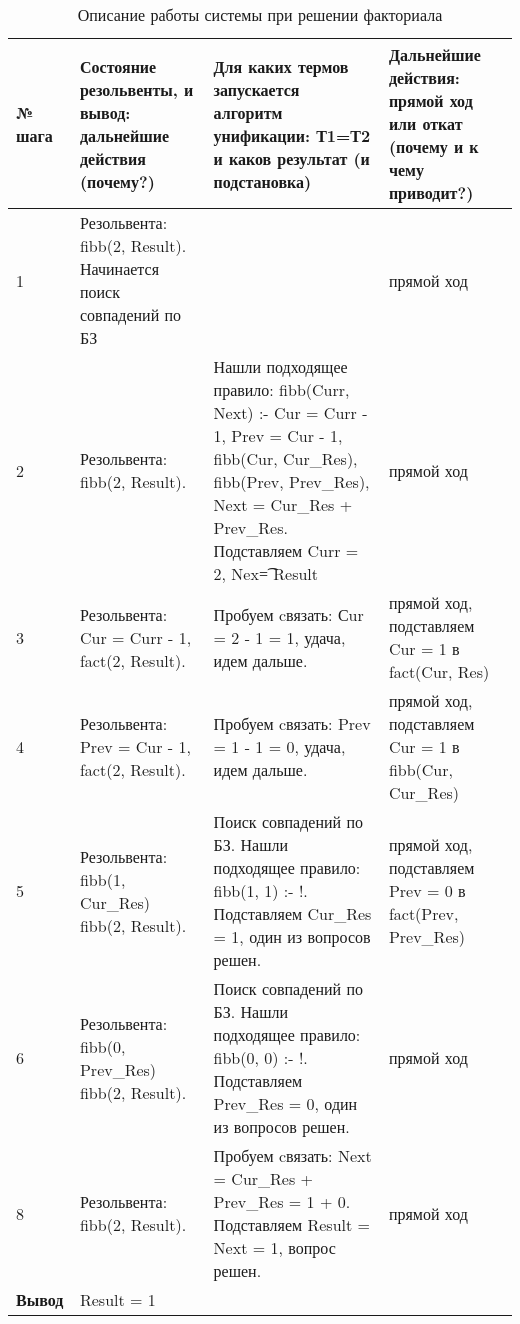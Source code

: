 \begin{table}
	\caption{Описание работы системы при решении факториала}
	\begin{tabular}{|p{1.2cm}|p{5cm}|p{5cm}|p{5cm}|}
		\hline
		№ шага & Состояние резольвенты, и вывод: дальнейшие действия (почему?) & Для каких термов запускается алгоритм унификации: Т1=Т2 и каков результат (и подстановка) & Дальнейшие действия: прямой ход или откат (почему и к чему приводит?) \\
		\hline
		1 & Резольвента: \newline fibb(2, Result). Начинается поиск совпадений по БЗ &  & прямой ход \\
		\hline
		2 & Резольвента: \newline fibb(2, Result). & Нашли подходящее правило: fibb(Curr, Next) :-  Cur = Curr - 1, Prev = Cur - 1, fibb(Cur, Cur\_Res), fibb(Prev, Prev\_Res), Next = Cur\_Res + Prev\_Res. Подставляем Curr = 2, Nex\t = Result & прямой ход \\
		\hline
		3 & Резольвента: \newline Cur = Curr - 1, \newline fact(2, Result). & Пробуем cвязать: Сur = 2 - 1 = 1, удача, идем дальше.   & прямой ход, подставляем Cur = 1 в fact(Cur, Res)\\
		\hline
		4 & Резольвента: \newline Prev = Cur - 1, \newline fact(2, Result). & Пробуем cвязать: Prev = 1 - 1 = 0, удача, идем дальше.   & прямой ход, подставляем Cur = 1 в fibb(Cur, Cur\_Res)\\
		\hline
		5 & Резольвента: \newline fibb(1, Cur\_Res) \newline fibb(2, Result). & Поиск совпадений по БЗ. Нашли подходящее правило: fibb(1, 1) :- !. Подставляем Cur\_Res = 1, один из вопросов решен.  & прямой ход, подставляем Prev = 0 в fact(Prev, Prev\_Res) \\
		\hline
		6 & Резольвента: \newline fibb(0, Prev\_Res) \newline fibb(2, Result). & Поиск совпадений по БЗ. Нашли подходящее правило: fibb(0, 0) :- !. Подставляем Prev\_Res = 0, один из вопросов решен.  & прямой ход\\
		\hline
		8 & Резольвента: \newline fibb(2, Result). & Пробуем cвязать: Next = Cur\_Res + Prev\_Res = 1 + 0. Подставляем Result = Next = 1, вопрос решен.  & прямой ход \\
		\hline
		\textbf{Вывод}& Result = 1 &  & \\
		\hline
	\end{tabular}
\end{table}

